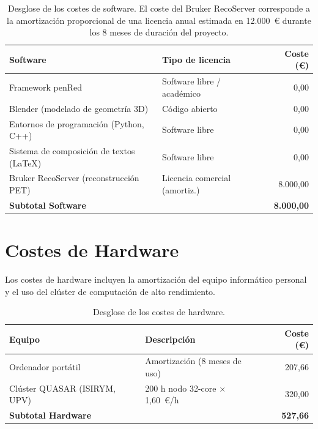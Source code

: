 \begin{table}[htbp]
  \centering
  \renewcommand{\arraystretch}{1.3}
  \begin{tabular}{l l r}
    \hline
    \textbf{Software}                           & \textbf{Tipo de licencia}     & \textbf{Coste (\euro)} \\
    \hline
    Framework penRed                            & Software libre / académico    & 0,00                   \\
    Blender (modelado de geometría 3D)          & Código abierto                & 0,00                   \\
    Entornos de programación (Python, C++)      & Software libre                & 0,00                   \\
    Sistema de composición de textos (\LaTeX{}) & Software libre                & 0,00                   \\
    Bruker RecoServer (reconstrucción PET)      & Licencia comercial (amortiz.) & 8.000,00               \\
    \hline
    \textbf{Subtotal Software}                  &                               & \textbf{8.000,00}      \\
    \hline
  \end{tabular}
  \caption{Desglose de los costes de software. El coste del Bruker RecoServer corresponde a la amortización proporcional de una licencia anual estimada en 12.000~\euro{} durante los 8 meses de duración del proyecto.}
  \label{tab:costes_software}
\end{table}

\section{Costes de Hardware}

Los costes de hardware incluyen la amortización del equipo informático personal y el uso del clúster de computación de alto rendimiento.

\begin{table}[htbp]
  \centering
  \renewcommand{\arraystretch}{1.3}
  \begin{tabular}{l l r}
    \hline
    \textbf{Equipo}              & \textbf{Descripción}                     & \textbf{Coste (\euro)} \\
    \hline
    Ordenador portátil           & Amortización (8 meses de uso)            & 207,66                 \\
    Clúster QUASAR (ISIRYM, UPV) & 200 h nodo 32-core $\times$ 1,60~\euro{}/h & 320,00                 \\
    \hline
    \textbf{Subtotal Hardware}   &                                          & \textbf{527,66}        \\
    \hline
  \end{tabular}
  \caption{Desglose de los costes de hardware.}
  \label{tab:costes_hardware}
\end{table}

